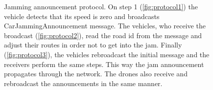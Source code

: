 \documentclass[]{nsm-thesis}
\begin{document}
\begin{figure}%
	\centering
	\hfill
	\hfill
	\caption{Jamming announcement protocol. On step 1 (\cref{fig:protocol1}) the vehicle detects that its speed is zero and broadcasts CarJammingAnnouncement message. The vehicles, who receive the broadcast (\cref{fig:protocol2}), read the road id from the message and adjust their routes in order not to get into the jam. Finally  (\cref{fig:protocol3}), the vehicles rebroadcast the initial message and the receivers perform the same steps. This way the jam announcement propagates through the network. The drones also receive and rebroadcast the announcements in the same manner.}%
	\label{fig:protocol}%
\end{figure}
\end{document}
